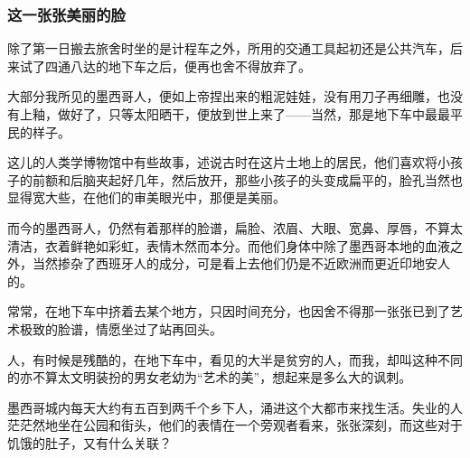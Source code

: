 \subsubsection*{这一张张美丽的脸}
\par 除了第一日搬去旅舍时坐的是计程车之外，所用的交通工具起初还是公共汽车，后来试了四通八达的地下车之后，便再也舍不得放弃了。
\par 大部分我所见的墨西哥人，便如上帝捏出来的粗泥娃娃，没有用刀子再细雕，也没有上釉，做好了，只等太阳晒干，便放到世上来了——当然，那是地下车中最最平民的样子。
\par 这儿的人类学博物馆中有些故事，述说古时在这片土地上的居民，他们喜欢将小孩子的前额和后脑夹起好几年，然后放开，那些小孩子的头变成扁平的，脸孔当然也显得宽大些，在他们的审美眼光中，那便是美丽。
\par 而今的墨西哥人，仍然有着那样的脸谱，扁脸、浓眉、大眼、宽鼻、厚唇，不算太清洁，衣着鲜艳如彩虹，表情木然而本分。而他们身体中除了墨西哥本地的血液之外，当然掺杂了西班牙人的成分，可是看上去他们仍是不近欧洲而更近印地安人的。
\par 常常，在地下车中挤着去某个地方，只因时间充分，也因舍不得那一张张已到了艺术极致的脸谱，情愿坐过了站再回头。
\par 人，有时候是残酷的，在地下车中，看见的大半是贫穷的人，而我，却叫这种不同的亦不算太文明装扮的男女老幼为“艺术的美”，想起来是多么大的讽刺。
\par 墨西哥城内每天大约有五百到两千个乡下人，涌进这个大都市来找生活。失业的人茫茫然地坐在公园和街头，他们的表情在一个旁观者看来，张张深刻，而这些对于饥饿的肚子，又有什么关联？



